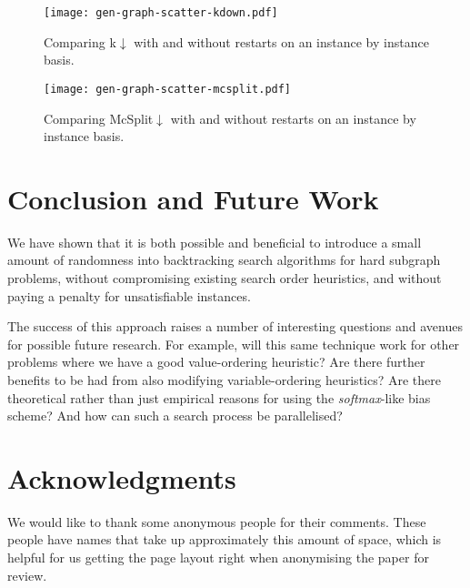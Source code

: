 \documentclass{article}
\begin{document}
\begin{figure}[p]
    \centering
    \texttt{[image: gen-graph-scatter-kdown.pdf]}
    \caption{Comparing k${\downarrow}$ with and without restarts on an instance by instance basis.}\label{figure:kdown}
\end{figure}

\begin{figure}[p]
    \centering
    \texttt{[image: gen-graph-scatter-mcsplit.pdf]}
    \caption{Comparing McSplit${\downarrow}$ with and without restarts on an instance by instance
    basis.}\label{figure:mcsplit}
\end{figure}

\section{Conclusion and Future Work}

We have shown that it is both possible and beneficial to introduce a small amount of randomness into
backtracking search algorithms for hard subgraph problems, without compromising existing search
order heuristics, and without paying a penalty for unsatisfiable instances.

The success of this approach raises a number of interesting questions and avenues for possible
future research. For example, will this same technique work for other problems where we have a good
value-ordering heuristic? Are there further benefits to be had from also modifying variable-ordering
heuristics? Are there theoretical rather than just empirical reasons for using the
\emph{softmax}-like bias scheme? And how can such a search process be parallelised?

\section*{Acknowledgments}

We would like to thank some anonymous people for their comments. These people have names that take
up approximately this amount of space, which is helpful for us getting the page layout right when
anonymising the paper for review.




\end{document}
